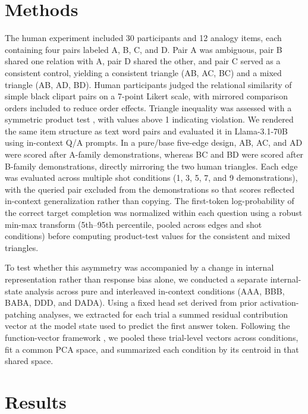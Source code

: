 \documentclass{ccn}
\begin{document}
\section{Methods}

The human experiment included 30 participants and 12 analogy items, each
containing four pairs labeled A, B, C, and D. Pair A was ambiguous, pair B
shared one relation with A, pair D shared the other, and pair C served as a
consistent control, yielding a consistent triangle (AB, AC, BC) and a mixed
triangle (AB, AD, BD). Human participants judged the relational similarity of
simple black clipart pairs on a 7-point Likert scale, with mirrored comparison
orders included to reduce order effects. Triangle inequality was assessed with a
symmetric product test \citep{PetersonEtAl2020}, with values above 1 indicating
violation. We rendered the same item structure as text word pairs and evaluated
it in Llama-3.1-70B using in-context Q/A prompts. In a pure/base five-edge
design, AB, AC, and AD were scored after A-family demonstrations, whereas BC
and BD were scored after B-family demonstrations, directly mirroring the two
human triangles. Each edge was evaluated across multiple shot conditions (1, 3,
5, 7, and 9 demonstrations), with the queried pair excluded from the
demonstrations so that scores reflected in-context generalization rather than
copying. The first-token log-probability of the correct target completion was
normalized within each question using a robust min-max transform (5th--95th
percentile, pooled across edges and shot conditions) before computing
product-test values for the consistent and mixed triangles.

To test whether this asymmetry was accompanied by a change in internal
representation rather than response bias alone, we conducted a separate
internal-state analysis across pure and interleaved in-context conditions (AAA,
BBB, BABA, DDD, and DADA). Using a fixed head set derived from prior
activation-patching analyses, we extracted for each trial a summed residual
contribution vector at the model state used to predict the first answer token.
Following the function-vector framework \citep{ToddEtAl2024}, we pooled these
trial-level vectors across conditions, fit a common PCA space, and summarized
each condition by its centroid in that shared space.

\section{Results}
\end{document}
